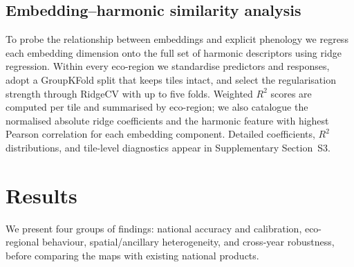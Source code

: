 \documentclass[utf8]{FrontiersinHarvard}
\begin{document}
\subsection{Embedding–harmonic similarity analysis}
To probe the relationship between embeddings and explicit phenology we regress each embedding dimension onto the full set of harmonic descriptors using ridge regression. Within every eco-region we standardise predictors and responses, adopt a GroupKFold split that keeps tiles intact, and select the regularisation strength through RidgeCV with up to five folds. Weighted $R^2$ scores are computed per tile and summarised by eco-region; we also catalogue the normalised absolute ridge coefficients and the harmonic feature with highest Pearson correlation for each embedding component. Detailed coefficients, $R^2$ distributions, and tile-level diagnostics appear in Supplementary Section~S3.

\section{Results}
\label{sec:results}
We present four groups of findings: national accuracy and calibration, eco-regional behaviour, spatial/ancillary heterogeneity, and cross-year robustness, before comparing the maps with existing national products.
\end{document}
